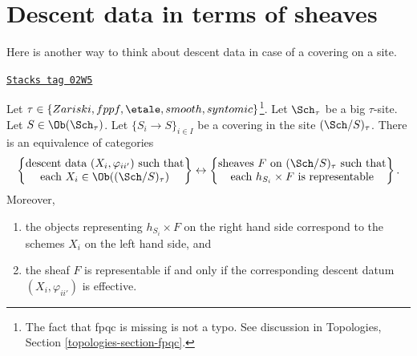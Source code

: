 \section{Descent data in terms of sheaves}
\label{descent-section-descent-data-sheaves}
Here is another way to think about descent data
in case of a covering on a site.

\begin{lemma}
\label{descent-lemma-descent-data-sheaves}
\href{https://stacks.math.columbia.edu/tag/02W5}{\texttt{Stacks tag 02W5}}

Let $\tau \in \{Zariski, fppf, \etale, smooth, syntomic\}$\footnote{The
fact that fpqc is missing is not a typo. See discussion
in Topologies, Section \ref{topologies-section-fpqc}.}.
Let $\Sch_\tau$ be a big $\tau$-site.
Let $S \in \Ob(\Sch_\tau)$.
Let $\{S_i \to S\}_{i \in I}$ be a covering in the
site $(\Sch/S)_\tau$. There is an equivalence of
categories
$$
\left\{
\begin{matrix}
\text{descent data }(X_i, \varphi_{ii'})\text{ such that}\\
\text{each }X_i \in \Ob((\Sch/S)_\tau)
\end{matrix}
\right\}
\leftrightarrow
\left\{
\begin{matrix}
\text{sheaves }F\text{ on }(\Sch/S)_\tau\text{ such that}\\
\text{each }h_{S_i} \times F\text{ is representable}
\end{matrix}
\right\}.
$$
Moreover,
\begin{enumerate}
\item the objects representing $h_{S_i} \times F$ on the right hand side
correspond to the schemes $X_i$ on the left hand side, and
\item the sheaf $F$ is representable if and only if the
corresponding descent datum $(X_i, \varphi_{ii'})$ is effective.
\end{enumerate}
\end{lemma}

